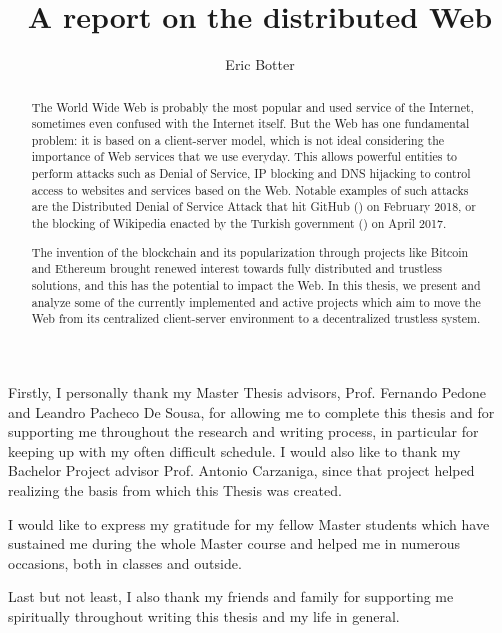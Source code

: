 \documentclass[mscthesis]{usiinfthesis}
\title{A report on the distributed Web} %
\subtitle{} %
\author{Eric Botter} %
\begin{document}
\maketitle %

\frontmatter %

\begin{abstract}
The World Wide Web is probably the most popular and used service of the Internet, sometimes even confused with the Internet itself. But the Web has one fundamental problem: it is based on a client-server model, which is not ideal considering the importance of Web services that we use everyday. This allows powerful entities to perform attacks such as Denial of Service, IP blocking and DNS hijacking to control access to websites and services based on the Web. Notable examples of such attacks are the Distributed Denial of Service Attack that hit GitHub (\cite{webarticle:githubddos}) on February 2018, or the blocking of Wikipedia enacted by the Turkish government (\cite{webarticle:turkeywikipedia}) on April 2017.

The invention of the blockchain and its popularization through projects like Bitcoin and Ethereum brought renewed interest towards fully distributed and trustless solutions, and this has the potential to impact the Web. In this thesis, we present and analyze some of the currently implemented and active projects which aim to move the Web from its centralized client-server environment to a decentralized trustless system.

\end{abstract}


\begin{acknowledgements}
Firstly, I personally thank my Master Thesis advisors, Prof. Fernando Pedone and Leandro Pacheco De Sousa, for allowing me to complete this thesis and for supporting me throughout the research and writing process, in particular for keeping up with my often difficult schedule. I would also like to thank my Bachelor Project advisor Prof. Antonio Carzaniga, since that project helped realizing the basis from which this Thesis was created.

I would like to express my gratitude for my fellow Master students which have sustained me during the whole Master course and helped me in numerous occasions, both in classes and outside. %

Last but not least, I also thank my friends and family for supporting me spiritually throughout writing this thesis and my life in general.
\end{acknowledgements}
\end{document}
